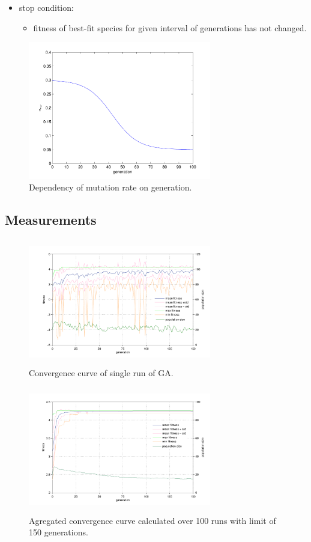 \documentclass[a4paper,jurnal]{IEEEtran}
\begin{document}
\begin{itemize}
	\item stop condition:
	\begin{itemize}
		\item fitness of best-fit species for given interval of generations has not changed.
	\end{itemize}	
\end{itemize}
\begin{figure}[h]
	\centering
	\includegraphics[width=80mm]{mut_r}
	\caption{Dependency of mutation rate on generation.}
	\label{fig:mut_r}
\end{figure}

\subsection{Measurements}

\begin{figure}[h]
	\centering
	\includegraphics[width=80mm,height=55mm]{ga_conv_curve_s}
	\caption{Convergence curve of single run of GA.}
	\label{fig:conv_curve_s}
\end{figure}
\begin{figure}[h]
	\centering
	\includegraphics[width=80mm,height=55mm]{ga_conv_curve}
	\caption{Agregated convergence curve calculated over 100 runs with limit of 150 generations.}
	\label{fig:conv_curve}
\end{figure}
\end{document}
